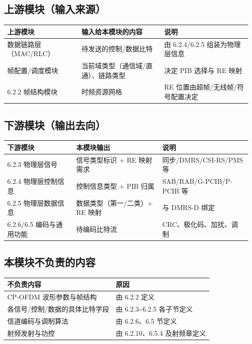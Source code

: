 \documentclass[11pt,a4paper]{ctexart}
\begin{document}
\subsection{上游模块（输入来源）}

\begin{table}[h]
\centering
\small
\begin{tabular}{p{4.2cm}p{4.5cm}p{5.5cm}}
\toprule
\textbf{上游模块} & \textbf{输入给本模块的内容} & \textbf{说明} \\
\midrule
数据链路层（MAC/RLC） & 待发送的控制/数据比特 & 由 6.2.4/6.2.5 组装为物理层信息 \\
帧配置/调度模块 & 当前域类型（通信域/直通）、链路类型 & 决定 PIB 选择与 RE 映射 \\
6.2.2 帧结构模块 & 时频资源网格 & RE 位置由超帧/无线帧/符号配置决定 \\
\bottomrule
\end{tabular}
\end{table}

\subsection{下游模块（输出去向）}

\begin{table}[h]
\centering
\small
\begin{tabular}{p{4.2cm}p{4.5cm}p{5.5cm}}
\toprule
\textbf{下游模块} & \textbf{本模块输出} & \textbf{说明} \\
\midrule
6.2.3 物理层信号 & 信号类型标识 + RE 映射需求 & 同步/DMRS/CSI-RS/PMS 等 \\
6.2.4 物理层控制信息 & 控制信息类型 + PIB 归属 & SAB/RAB/G-PCIB/P-PCIB 等 \\
6.2.5 物理层数据信息 & 数据类型（第一/二类）+ RE 映射 & 与 DMRS-D 绑定 \\
6.2.6/6.5 编码与通用功能 & 待编码比特流 & CRC、极化码、加扰、调制 \\
\bottomrule
\end{tabular}
\end{table}

\subsection{本模块不负责的内容}

\begin{table}[h]
\centering
\small
\begin{tabular}{p{5.5cm}p{8.5cm}}
\toprule
\textbf{不负责内容} & \textbf{原因} \\
\midrule
CP-OFDM 波形参数与帧结构 & 由 6.2.2 定义 \\
各信号/控制/数据的具体比特字段 & 由 6.2.3\textasciitilde 6.2.5 各子节定义 \\
信道编码与调制算法 & 由 6.2.6、6.5 节定义 \\
射频发射与功控 & 由 6.2.10、6.5.4 及射频章定义 \\
\bottomrule
\end{tabular}
\end{table}
\end{document}
